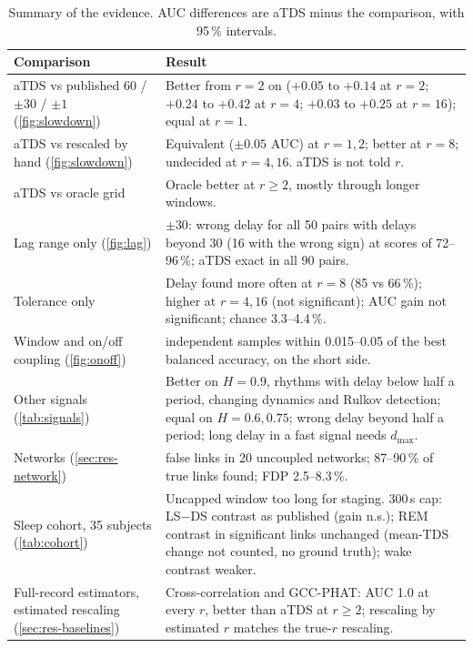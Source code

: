 \documentclass[11pt,a4paper]{article}
\begin{document}
\begin{table}[t]
\centering
\caption{Summary of the evidence. AUC differences are aTDS minus the comparison, with 95\,\% intervals.}
\label{tab:summary}
\footnotesize
\begin{tabularx}{\textwidth}{>{\raggedright\arraybackslash}p{4.2cm}>{\raggedright\arraybackslash}X}
\toprule
Comparison & Result \\
\midrule
aTDS vs published 60 / $\pm30$ / $\pm1$ (\cref{fig:slowdown}) & Better from $r = 2$ on ($+0.05$ to $+0.14$ at $r = 2$; $+0.24$ to $+0.42$ at $r = 4$; $+0.03$ to $+0.25$ at $r = 16$); equal at $r = 1$. \\
aTDS vs rescaled by hand (\cref{fig:slowdown}) & Equivalent ($\pm0.05$ AUC) at $r = 1, 2$; better at $r = 8$; undecided at $r = 4, 16$. aTDS is not told $r$. \\
aTDS vs oracle grid & Oracle better at $r \ge 2$, mostly through longer windows. \\
Lag range only (\cref{fig:lag}) & $\pm30$: wrong delay for all 50 pairs with delays beyond 30 (16 with the wrong sign) at scores of 72--96\,\%; aTDS exact in all 90 pairs. \\
Tolerance only & Delay found more often at $r = 8$ (85 vs 66\,\%); higher at $r = 4, 16$ (not significant); AUC gain not significant; chance 3.3--4.4\,\%. \\
Window and on/off coupling (\cref{fig:onoff}) & 30 independent samples within 0.015--0.05 of the best balanced accuracy, on the short side. \\
Other signals (\cref{tab:signals}) & Better on $H = 0.9$, rhythms with delay below half a period, changing dynamics and Rulkov detection; equal on $H = 0.6, 0.75$; wrong delay beyond half a period; long delay in a fast signal needs $d_{\max}$. \\
Networks (\cref{sec:res-network}) & 0 false links in 20 uncoupled networks; 87--90\,\% of true links found; FDP 2.5--8.3\,\%. \\
Sleep cohort, 35 subjects (\cref{tab:cohort}) & Uncapped window too long for staging. 300\,s cap: LS$-$DS contrast as published (gain n.s.); REM contrast in significant links unchanged (mean-TDS change not counted, no ground truth); wake contrast weaker. \\
Full-record estimators, estimated rescaling (\cref{sec:res-baselines}) & Cross-correlation and GCC-PHAT: AUC 1.0 at every $r$, better than aTDS at $r \ge 2$; rescaling by estimated $r$ matches the true-$r$ rescaling. \\

\end{tabularx}
\end{table}
\end{document}

